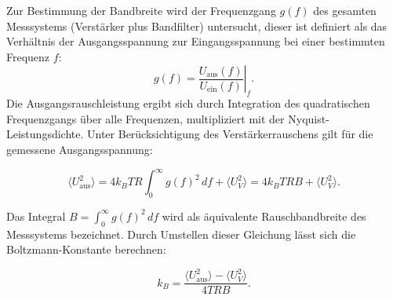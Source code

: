 Zur Bestimmung der Bandbreite wird der Frequenzgang \(g(f)\) des gesamten Messsystems (Verstärker plus Bandfilter) untersucht, dieser ist definiert als das Verhältnis der Ausgangsspannung zur Eingangsspannung bei einer bestimmten Frequenz \(f\):
\begin{equation} \label{eq:freq_response} 
    g(f) = \left. \frac{U_{\text{aus}}(f)}{U_{\text{ein}}(f)} \right|_f .
\end{equation}
Die Ausgangsrauschleistung ergibt sich durch Integration des quadratischen Frequenzgangs über alle Frequenzen, multipliziert mit der Nyquist-Leistungsdichte. Unter Berücksichtigung des Verstärkerrauschens gilt für die gemessene Ausgangsspannung:

\begin{equation} \label{eq:output_voltage} 
    \langle U_{\text{aus}}^2 \rangle = 4 k_B T R \int_0^\infty g(f)^2 \, df + \langle U_V^2 \rangle = 4 k_B T R B + \langle U_V^2 \rangle .
\end{equation}

Das Integral \(B = \int_0^\infty g(f)^2 \, df\) wird als äquivalente Rauschbandbreite des Messsystems bezeichnet. Durch Umstellen dieser Gleichung lässt sich die Boltzmann-Konstante berechnen:

\begin{equation} \label{eq:boltzmann_calc} 
    k_B = \frac{\langle U_{\text{aus}}^2 \rangle - \langle U_V^2 \rangle}{4 T R B} .
\end{equation}





